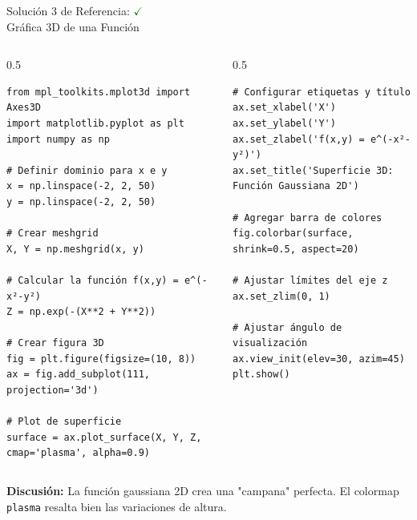 \documentclass[10pt]{beamer}
\begin{document}
\begin{frame}[fragile]{Solución 3 de Referencia: \hfill \textcolor{green}{$\checkmark$} \\ Gráfica 3D de una Función}
\begin{columns}
\begin{column}{0.5\textwidth}
\begin{verbatim}
from mpl_toolkits.mplot3d import Axes3D
import matplotlib.pyplot as plt
import numpy as np

# Definir dominio para x e y
x = np.linspace(-2, 2, 50)
y = np.linspace(-2, 2, 50)

# Crear meshgrid
X, Y = np.meshgrid(x, y)

# Calcular la función f(x,y) = e^(-x²-y²)
Z = np.exp(-(X**2 + Y**2))

# Crear figura 3D
fig = plt.figure(figsize=(10, 8))
ax = fig.add_subplot(111, projection='3d')

# Plot de superficie
surface = ax.plot_surface(X, Y, Z, cmap='plasma', alpha=0.9)
\end{verbatim}
\end{column}
\begin{column}{0.5\textwidth}
\begin{verbatim}
# Configurar etiquetas y título
ax.set_xlabel('X')
ax.set_ylabel('Y')
ax.set_zlabel('f(x,y) = e^(-x²-y²)')
ax.set_title('Superficie 3D: Función Gaussiana 2D')

# Agregar barra de colores
fig.colorbar(surface, shrink=0.5, aspect=20)

# Ajustar límites del eje z
ax.set_zlim(0, 1)

# Ajustar ángulo de visualización
ax.view_init(elev=30, azim=45)
plt.show()
\end{verbatim}
\end{column}
\end{columns}
\vspace{0.3cm}
\textbf{Discusión:} La función gaussiana 2D crea una "campana" perfecta. El colormap \texttt{plasma} resalta bien las variaciones de altura.
\end{frame}
\end{document}
